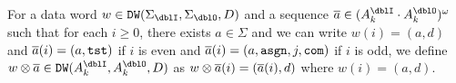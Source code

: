 For a data word
$w\in\DW(\Sigma_\dblI,\Sigma_\dblO,D)$ and
a sequence $\overa\in(A_k^\dblI\cdot A_k^\dblO)^\omega$
such that
for each $i\geq 0$, there exists
$a\in\Sigma$
and we can write
$w(i)=(a,d)$ and ${\overline{a}}(i)=(a,\mathtt{tst})$ if $i$ is even
and ${\overline{a}}(i)=(a,\mathtt{asgn},j,\mathtt{com})$ if $i$ is odd,
we define $w\otimes\overa\in\DW(A_k^\dblI,A_k^\dblO,D)$ as
$w\otimes{\overline{a}}(i)=({\overline{a}}(i), d)$ where $w(i)=(a,d)$.

